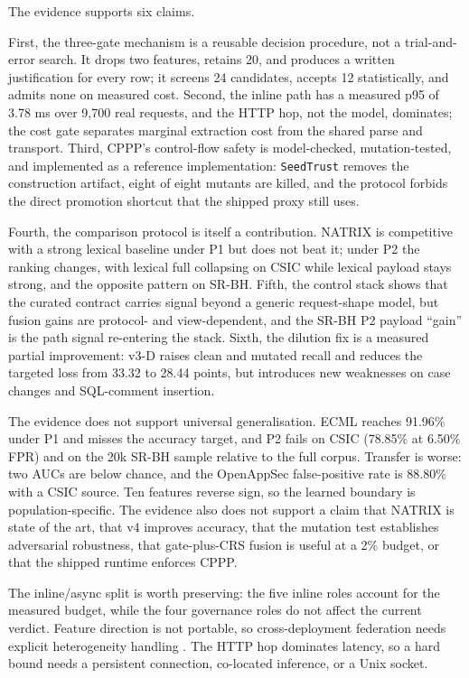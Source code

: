 \documentclass[preprint,11pt]{elsarticle}
\begin{document}
The evidence supports six claims.

First, the three-gate mechanism is a reusable decision procedure, not a
trial-and-error search. It drops two features, retains 20, and produces
a written justification for every row; it screens 24 candidates, accepts
12 statistically, and admits none on measured cost. Second, the inline
path has a measured p95 of 3.78 ms over 9,700 real requests, and the
HTTP hop, not the model, dominates; the cost gate separates marginal
extraction cost from the shared parse and transport. Third, CPPP's
control-flow safety is model-checked, mutation-tested, and implemented
as a reference implementation: \texttt{Seed\allowbreak{}Trust} removes the
construction artifact, eight of eight mutants are killed, and the
protocol forbids the direct promotion shortcut that the shipped proxy
still uses.

Fourth, the comparison protocol is itself a contribution. NATRIX is
competitive with a strong lexical baseline under P1 but does not beat
it; under P2 the ranking changes, with lexical full collapsing on CSIC
while lexical payload stays strong, and the opposite pattern on SR-BH.
Fifth, the control stack shows that the curated contract carries signal
beyond a generic request-shape model, but fusion gains are protocol- and
view-dependent, and the SR-BH P2 payload ``gain'' is the path signal
re-entering the stack. Sixth, the dilution fix is a measured partial
improvement: v3-D raises clean and mutated recall and reduces the
targeted loss from 33.32 to 28.44 points, but introduces new weaknesses
on case changes and SQL-comment insertion.

The evidence does not support universal generalisation. ECML reaches
91.96\% under P1 and misses the accuracy target, and P2 fails on CSIC
(78.85\% at 6.50\% FPR) and on the 20k SR-BH sample relative to the full
corpus. Transfer is worse: two AUCs are below chance, and the OpenAppSec
false-positive rate is 88.80\% with a CSIC source. Ten features reverse
sign, so the learned boundary is population-specific. The evidence also
does not support a claim that NATRIX is state of the art, that v4
improves accuracy, that the mutation test establishes adversarial
robustness, that gate-plus-CRS fusion is useful at a 2\% budget, or that
the shipped runtime enforces CPPP.

The inline/async split is worth preserving: the five inline roles
account for the measured budget, while the four governance roles do not
affect the current verdict. Feature direction is not portable, so
cross-deployment federation needs explicit heterogeneity handling
\citep{mcmahan2017communication, kairouz2021advances}. The HTTP hop
dominates latency, so a hard bound needs a persistent connection,
co-located inference, or a Unix socket.
\end{document}
